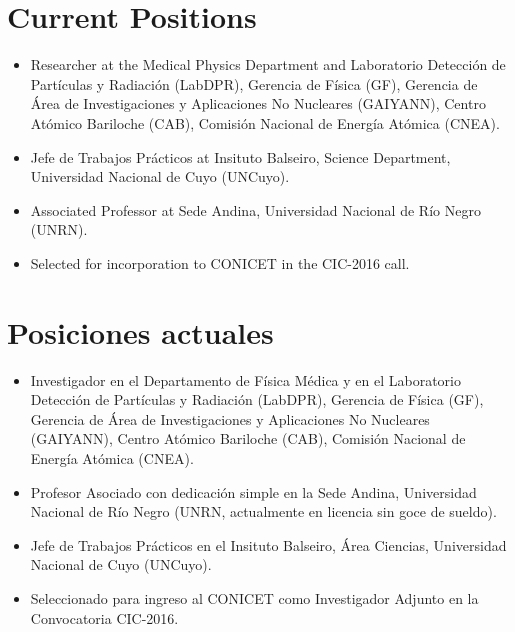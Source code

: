 \ifeng
\section*{Current Positions}
\begin{itemize}
	\item Researcher at the Medical Physics Department and Laboratorio Detección de Partículas y Radiación (LabDPR), Gerencia de Física (GF), Gerencia de Área de Investigaciones y Aplicaciones No Nucleares (GAIYANN), Centro Atómico Bariloche (CAB), Comisión Nacional de Energía Atómica (CNEA).
  \item Jefe de Trabajos Prácticos at Insituto Balseiro, Science Department, Universidad Nacional de Cuyo (UNCuyo).
  \item Associated Professor at Sede Andina, Universidad Nacional de Río Negro (UNRN).
  \item Selected for incorporation to CONICET in the CIC-2016 call.
\end{itemize}
\else
\section*{Posiciones actuales}
\begin{itemize}
	\item Investigador en el Departamento de Física Médica y en el Laboratorio Detección de Partículas y Radiación (LabDPR), Gerencia de Física (GF), Gerencia de Área de Investigaciones y Aplicaciones No Nucleares (GAIYANN), Centro Atómico Bariloche (CAB), Comisión Nacional de Energía Atómica (CNEA).
	\item Profesor Asociado con dedicación simple en la Sede Andina, Universidad Nacional de Río Negro (UNRN, actualmente en licencia sin goce de sueldo).
	\item Jefe de Trabajos Prácticos en el Insituto Balseiro, Área Ciencias, Universidad Nacional de Cuyo (UNCuyo).
\item Seleccionado para ingreso al CONICET como Investigador Adjunto en la Convocatoria CIC-2016.
\end{itemize}
\fi

\ifeng
